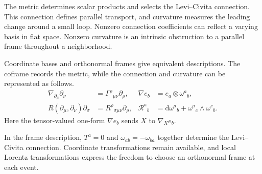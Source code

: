 \documentclass[11pt,a4paper]{article}
\numberwithin{equation}{section}
\newcommand{\dd}{\mathrm d}
\begin{document}
The metric determines scalar products and selects the Levi--Civita
connection. This connection defines parallel transport, and curvature
measures the leading change around a small loop. Nonzero connection
coefficients can reflect a varying basis in flat space. Nonzero
curvature is an intrinsic obstruction to a parallel frame throughout a
neighborhood.

Coordinate bases and orthonormal frames give equivalent descriptions.
The coframe records the metric, while the connection and curvature
can be represented as follows.
\[
 \begin{aligned}
 \nabla_{\partial_\mu}\partial_\nu
   &=\Gamma^\rho{}_{\mu\nu}\partial_\rho,
 &\nabla e_b&=e_a\otimes\omega^a{}_b,\\
 R(\partial_\mu,\partial_\nu)\partial_\sigma
   &=R^\rho{}_{\sigma\mu\nu}\partial_\rho,
 &\mathcal R^a{}_b
   &=\dd\omega^a{}_b+\omega^a{}_c\wedge\omega^c{}_b.
 \end{aligned}
\]
Here the tensor-valued one-form \(\nabla e_b\) sends \(X\)
to \(\nabla_Xe_b\).

In the frame description, \(T^a=0\) and
\(\omega_{ab}=-\omega_{ba}\) together determine the Levi--Civita
connection. Coordinate transformations remain available, and local
Lorentz transformations express the freedom to choose an orthonormal
frame at each event.
\end{document}
